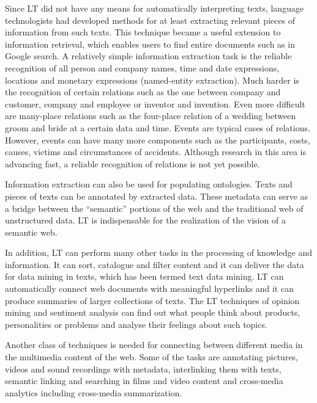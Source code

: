 \documentclass[10pt, plain]{../../metanetpaper}
\begin{document}
\begin{multicols}{2}
Since LT did not have any means for automatically interpreting texts, language technologists had developed methods for at least extracting relevant pieces of information from such texts. This technique became a useful extension to information retrieval, which enables users to find entire documents such as in Google search. A relatively simple information extraction task is the reliable recognition of all person and company names, time and date expressions, locations and monetary expressions (named-entity extraction). Much harder is the recognition of certain relations such as the one between company and customer, company and employee or inventor and invention. Even more difficult are many-place relations such as the four-place relation of a wedding between groom and bride at a certain data and time. Events are typical cases of relations. However, events can have many more components such as the participants, costs, causes, victims and circumstances of accidents. Although research in this area is advancing fast, a reliable recognition of relations is not yet possible.
 
Information extraction can also be used for populating ontologies. Texts and pieces of texts can be annotated by extracted data. These metadata can serve as a bridge between the ``semantic'' portions of the web and the traditional web of unstructured data. LT is indispensable for the realization of the vision of a semantic web. 
 
In addition, LT can perform many other tasks in the processing of knowledge and information. It can sort, catalogue and filter content and it can deliver the data for data mining in texts, which has been termed text data mining. LT can automatically connect web documents with meaningful hyperlinks and it can produce summaries of larger collections of texts. The LT techniques of opinion mining and sentiment analysis can find out what people think about products, personalities or problems and analyse their feelings about such topics.

Another class of techniques is needed for connecting between different media in the multimedia content of the web. Some of the tasks are annotating pictures, videos and sound recordings with metadata, interlinking them with texts, semantic linking and searching in films and video content and cross-media analytics including cross-media summarization.
 

\end{multicols}
\end{document}
